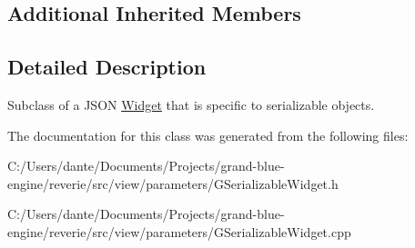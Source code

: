 \subsection*{Additional Inherited Members}


\subsection{Detailed Description}
Subclass of a J\+S\+ON \mbox{\hyperlink{class_widget}{Widget}} that is specific to serializable objects. 

The documentation for this class was generated from the following files\+:\begin{DoxyCompactItemize}
\item 
C\+:/\+Users/dante/\+Documents/\+Projects/grand-\/blue-\/engine/reverie/src/view/parameters/G\+Serializable\+Widget.\+h\item 
C\+:/\+Users/dante/\+Documents/\+Projects/grand-\/blue-\/engine/reverie/src/view/parameters/G\+Serializable\+Widget.\+cpp\end{DoxyCompactItemize}
